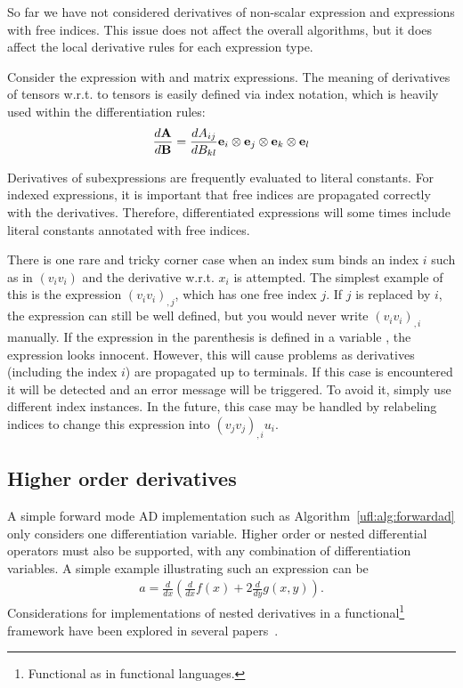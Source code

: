 So far we have not considered derivatives of non-scalar expression and
expressions with free indices.  This issue does not affect the overall
algorithms, but it does affect the local derivative rules for each
expression type.

Consider the expression  with  and
 matrix expressions.  The meaning of derivatives of tensors
w.r.t. to tensors is easily defined via index notation, which is
heavily used within the differentiation rules:
\begin{align}
\frac{d\mathbf{A}}{d\mathbf{B}} = \frac{dA_{ij}}{d B_{kl}} \mathbf{e}_i\otimes\mathbf{e}_j\otimes\mathbf{e}_k\otimes\mathbf{e}_l
\end{align}

Derivatives of subexpressions are frequently evaluated to literal
constants.  For indexed expressions, it is important that free indices
are propagated correctly with the derivatives.  Therefore,
differentiated expressions will some times include literal constants
annotated with free indices.

There is one rare and tricky corner case when an index sum binds an
index $i$ such as in $(v_i v_i)$ and the derivative w.r.t. $x_i$ is
attempted.  The simplest example of this is the expression $(v_i
v_i)_{,j}$, which has one free index $j$.  If $j$ is replaced by $i$,
the expression can still be well defined, but you would never write
$(v_i v_i)_{,i}$ manually.  If the expression in the parenthesis is
defined in a variable , the expression
 looks innocent. However, this
will cause problems as derivatives (including the
index $i$) are propagated up to terminals.
If this case is encountered it will be detected
and an error message will be triggered.
To avoid it, simply use different index instances.
In the future, this case may be handled by relabeling
indices to change this expression into $(v_j v_j)_{,i}u_i$.

\subsection{Higher order derivatives}
A simple forward mode AD implementation such as
Algorithm~\ref{ufl:alg:forwardad} only considers one differentiation
variable.  Higher order or nested differential operators must also be
supported, with any combination of differentiation variables.  A
simple example illustrating such an expression can be
\begin{align} \label{ufl:eq:nested}
a = \frac{d}{dx}\left( \frac{d}{dx} f(x) + 2 \frac{d}{dy} g(x,y) \right) .
\end{align}
Considerations for implementations of nested derivatives
in a functional\footnote{Functional as in functional languages.}
framework have been explored in several
papers~\cite{Kar2001,PeaSis2007,SisPea2008}.

